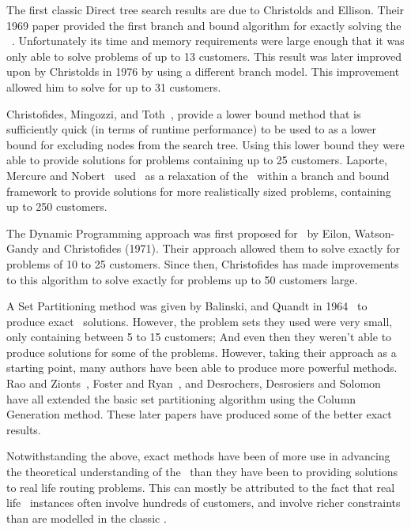 The first classic Direct tree search results are due to Christolds and Ellison. Their 1969 paper provided the first branch and bound algorithm for exactly solving the \VRP~\cite{CE:1969}. Unfortunately its time and memory requirements were large enough that it was only able to solve problems of up to 13 customers. This result was later improved upon by Christolds in 1976 by using a different branch model. This improvement allowed him to solve for up to 31 customers. 

Christofides, Mingozzi, and Toth~\cite{CMT:1981}, provide a lower bound method that is sufficiently quick (in terms of runtime performance) to be used to as a lower bound for excluding nodes from the search tree. Using this lower bound they were able to provide solutions for problems containing up to 25 customers. Laporte, Mercure and Nobert~\cite{LMN:1986} used \MTSP\ as a relaxation of the \VRP\ within a branch and bound framework to provide solutions for more realistically sized problems, containing up to 250 customers.  

The Dynamic Programming approach was first proposed for \VRP\ by Eilon, Watson-Gandy and Christofides (1971). Their approach allowed them to solve exactly for problems of 10 to 25 customers. Since then, Christofides has made improvements to this algorithm to solve exactly for problems up to 50 customers large.

A Set Partitioning method was given by Balinski, and Quandt in 1964~\cite{balinski:64} to produce exact \VRP\ solutions. However, the problem sets they used were very small, only containing between 5 to 15 customers; And even then they weren't able to produce solutions for some of the problems. However, taking their approach as a starting point, many authors have been able to produce more powerful methods. Rao and Zionts~\cite{RZ:1968}, Foster and Ryan~\cite{FR:1976}, and Desrochers, Desrosiers and Solomon~\cite{DMDJSM:1992} have all extended the basic set partitioning algorithm using the Column Generation method. These later papers have produced some of the better exact results. 

Notwithstanding the above, exact methods have been of more use in advancing the theoretical understanding of the \VRP\ than they have been to providing solutions to real life routing problems. This can mostly be attributed to the fact that real life \VRP\ instances often involve hundreds of customers, and involve richer constraints than are modelled in the classic \VRP.


